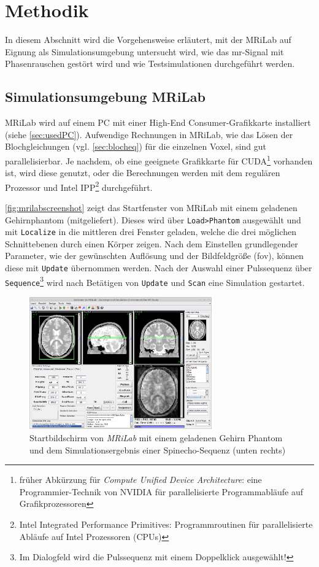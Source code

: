 \chapter{Methodik}
In diesem Abschnitt wird die Vorgehensweise erläutert, mit der MRiLab auf Eignung als Simulationsumgebung untersucht wird, wie das \gls{mr}-Signal mit Phasenrauschen gestört wird und wie Testsimulationen durchgeführt werden.

\section{Simulationsumgebung MRiLab}
MRiLab wird auf einem PC mit einer High-End Consumer-Grafikkarte installiert (siehe \autoref{sec:usedPC}). Aufwendige Rechnungen in MRiLab, wie das Lösen der Blochgleichungen (vgl. \autoref{sec:blocheq}) für die einzelnen Voxel, sind gut parallelisierbar. Je nachdem, ob eine geeignete Grafikkarte für CUDA\footnote{früher Abkürzung für \textit{Compute Unified Device Architecture}: eine Programmier-Technik von NVIDIA für parallelisierte Programmabläufe auf Grafikprozessoren} vorhanden ist, wird diese genutzt, oder die Berechnungen werden mit dem regulären Prozessor und Intel IPP\footnote{Intel Integrated Performance Primitives: Programmroutinen für parallelisierte Abläufe auf Intel Prozessoren (CPUs)} durchgeführt.

\autoref{fig:mrilabscreenshot} zeigt das Startfenster von MRiLab mit einem geladenen Gehirnphantom (mitgeliefert). Dieses wird über \texttt{Load>Phantom} ausgewählt und mit \texttt{Localize} in die mittleren drei Fenster geladen, welche die drei möglichen Schnittebenen durch einen Körper zeigen. Nach dem Einstellen grundlegender Parameter, wie der gewünschten Auflösung und der Bildfeldgröße (\gls{fov}), können diese mit \texttt{Update} übernommen werden. Nach der Auswahl einer Pulssequenz über \texttt{Sequence}\footnote{Im Dialogfeld wird die Pulssequenz mit einem Doppelklick ausgewählt!} wird nach Betätigen von \texttt{Update} und \texttt{Scan} eine Simulation gestartet.

\begin{figure}[H]
	\centering
	\includegraphics[width=0.7\textwidth]{img/mrilabScreenshot.png}
	\caption[MRiLab Startbildschirm]{Startbildschirm von \textit{MRiLab} mit einem geladenen Gehirn Phantom und dem Simulationsergebnis einer Spinecho-Sequenz (unten rechts)}
	\label{fig:mrilabscreenshot}
\end{figure}

